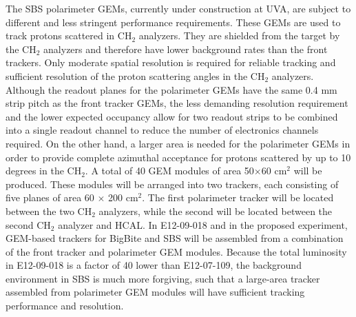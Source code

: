The SBS polarimeter GEMs, currently under construction at UVA, are subject to different and less stringent performance requirements. These GEMs are used to track protons scattered in CH$_2$ analyzers. They are shielded from the target by the CH$_2$ analyzers and therefore have lower background rates than the front trackers. Only moderate spatial resolution is required for reliable tracking and sufficient resolution of the proton scattering angles in the CH$_2$ analyzers. Although the readout planes for the polarimeter GEMs have the same 0.4 mm strip pitch as the front tracker GEMs, the less demanding resolution requirement and the lower expected occupancy allow for two readout strips to be combined into a single readout channel to reduce the number of electronics channels required. On the other hand, a larger area is needed for the polarimeter GEMs in order to provide complete azimuthal acceptance for protons scattered by up to 10 degrees in the CH$_2$. A total of 40 GEM modules of area 50$\times$60 cm$^2$ will be produced. These modules will be arranged into two trackers, each consisting of five planes of area 60 $\times$ 200 cm$^2$. The first polarimeter tracker will be located between the two CH$_2$ analyzers, while the second will be located between the second CH$_2$ analyzer and HCAL. %
In E12-09-018 and in the proposed experiment, GEM-based trackers for BigBite and SBS will be assembled from a combination of the front tracker and polarimeter GEM modules. Because the total luminosity in E12-09-018 is a factor of 40 lower than E12-07-109, the background environment in SBS is much more forgiving, such that a large-area tracker assembled from polarimeter GEM modules will have sufficient tracking performance and resolution.

